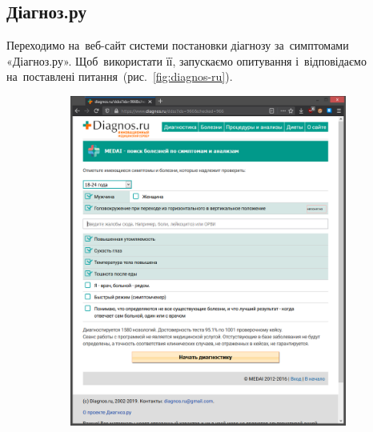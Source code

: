 \documentclass[
  a4paper,
  oneside,
  BCOR = 10mm,
  DIV = 12,
  12pt,
  headings = normal,
]{scrartcl}
\newlength{\gridunitwidth}
\begin{document}
    \subsection{Діагноз.ру}
      Переходимо на~веб-сайт системи постановки діагнозу за~симптомами «Діагноз.ру». Щоб~використати її, запускаємо опитування і~відповідаємо на~поставлені питання~(рис.~\ref{fig:diagnos-ru}).

      \begin{figure}[!htbp]
        \begin{subfigure}[b]{6 \gridunitwidth - 1em /2}
          \includegraphics[width = \columnwidth]{./assets/06.png}
          \caption{}
          \label{subfig:diagnos-ru-01}
        \end{subfigure}%
        \hspace{1em}%
        \begin{subfigure}[b]{6 \gridunitwidth - 1em /2}

\end{subfigure}
\end{figure}
\end{document}
